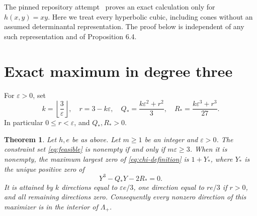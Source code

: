 \documentclass[11pt]{article}
\newtheorem{theorem}{Theorem}
\newcommand{\Lam}{\Lambda_+}
\begin{document}
The pinned repository attempt~\cite{Prior} proves an exact calculation only
for \(h(x,y)=xy\). Here we treat every hyperbolic cubic, including cones
without an assumed determinantal representation. The proof below is
independent of any such representation and of Proposition 6.4.

\section{Exact maximum in degree three}

For \(\varepsilon>0\), set
\begin{equation}\label{eq:constants}
 k=\left\lfloor\frac{3}{\varepsilon}\right\rfloor,
 \quad r=3-k\varepsilon,\quad
 Q_* =\frac{k\varepsilon^2+r^2}{3},\quad
 R_* =\frac{k\varepsilon^3+r^3}{27}.
\end{equation}
In particular \(0\leq r<\varepsilon\), and \(Q_*,R_*>0\).

\begin{theorem}\label{thm:main}
Let \(h,e\) be as above. Let \(m\geq1\) be an integer and
\(\varepsilon>0\). The constraint set \eqref{eq:feasible} is nonempty if and
only if \(m\varepsilon\geq3\). When it is nonempty, the maximum largest zero
of \eqref{eq:chi-definition} is \(1+Y_*\), where \(Y_*\) is the unique
positive zero of
\begin{equation}\label{eq:optimal-cubic}
 Y^3-Q_*Y-2R_*=0.
\end{equation}
It is attained by \(k\) directions equal to \(\varepsilon e/3\), one
direction equal to \(re/3\) if \(r>0\), and all remaining directions zero.
Consequently every nonzero direction of this maximizer is in the interior
of \(\Lam\).
\end{theorem}
\end{document}
